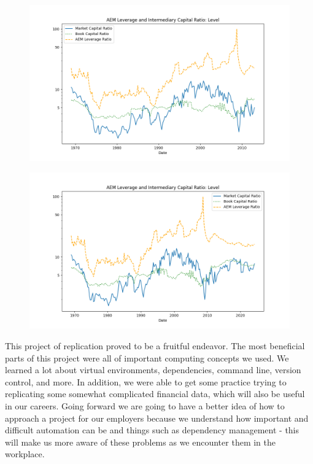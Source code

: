 \documentclass{article}
\begin{document}
\clearpage

\begin{figure}[htbp]\centering\includegraphics[width=\linewidth]{table03_figure.png}\end{figure}\par
\begin{figure}[htbp]\centering\includegraphics[width=\linewidth]{updated_table03_figure.png}\end{figure}\par
\clearpage
This project of replication proved to be a fruitful endeavor. The most beneficial parts of this project were all of important computing concepts we used. We learned a lot about virtual environments, dependencies, command line, version control, and more. In addition, we were able to get some practice trying to replicating some somewhat complicated financial data, which will also be useful in our careers.
Going forward we are going to have a better idea of how to approach a project for our employers because we understand how important and difficult automation can be and things such as dependency management - this will make us more aware of these problems as we encounter them in the workplace.\clearpage
\end{document}
